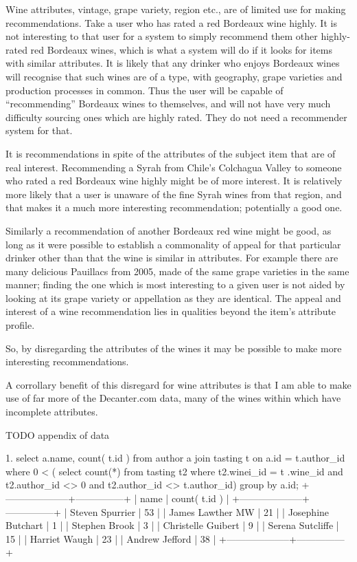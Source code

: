 Wine attributes, vintage, grape variety, region etc., are of limited use for making recommendations. Take a user who has rated a red Bordeaux wine highly. It is not interesting to that user for a system to simply recommend them other highly-rated red Bordeaux wines, which is what a system will do if it looks for items with similar attributes. It is likely that any drinker who enjoys Bordeaux wines will recognise that such wines are of a type, with geography, grape varieties and production processes in common. Thus the user will be capable of ``recommending'' Bordeaux wines to themselves, and will not have very much difficulty sourcing ones which are highly rated. They do not need a recommender system for that.

It is recommendations in spite of the attributes of the subject item that are of real interest. Recommending a Syrah from Chile's Colchagua Valley to someone who rated a red Bordeaux wine highly might be of more interest. It is relatively more likely that a user is unaware of the fine Syrah wines from that region, and that makes it a much more interesting recommendation; potentially a good one.

Similarly a recommendation of another Bordeaux red wine might be good, as long as it were possible to establish a commonality of appeal for that particular drinker other than that the wine is similar in attributes. For example there are many delicious Pauillacs from 2005, made of the same grape varieties in the same manner; finding the one which is most interesting to a given user is not aided by looking at its grape variety or appellation as they are identical. The appeal and interest of a wine recommendation lies in qualities beyond the item's attribute profile.

So, by disregarding the attributes of the wines it may be possible to make more interesting recommendations.

A corrollary benefit of this disregard for wine attributes is that I am able to make use of far more of the Decanter.com data, many of the wines within which have incomplete attributes.

TODO appendix of data


1. select a.name, count( t.id ) from author a join tasting t on a.id = t.author\_id where 0 < ( select count(*) from tasting t2 where t2.winei\_id = t
.wine\_id and t2.author\_id <> 0 and t2.author\_id <> t.author\_id)  group by a.id;                                                                        
+--------------------+---------------+
| name               | count( t.id ) |
+--------------------+---------------+
| Steven Spurrier    |            53 |
| James Lawther MW   |            21 |
| Josephine Butchart |             1 |
| Stephen Brook      |             3 |
| Christelle Guibert |             9 |
| Serena Sutcliffe   |            15 |
| Harriet Waugh      |            23 |
| Andrew Jefford     |            38 |
+--------------------+---------------+

